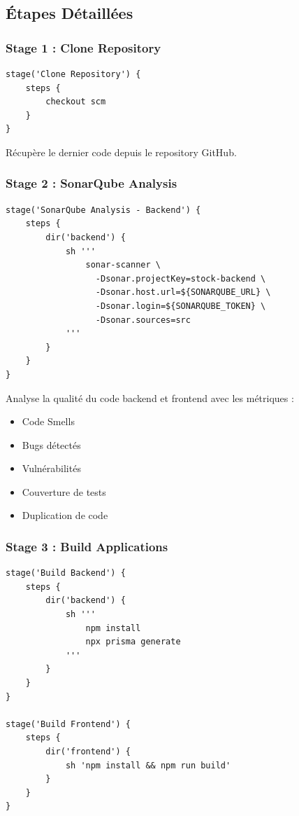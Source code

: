 \documentclass[12pt,a4paper]{report}
\begin{document}
\subsection{Étapes Détaillées}

\subsubsection{Stage 1 : Clone Repository}

\begin{verbatim}
stage('Clone Repository') {
    steps {
        checkout scm
    }
}
\end{verbatim}

Récupère le dernier code depuis le repository GitHub.

\subsubsection{Stage 2 : SonarQube Analysis}

\begin{verbatim}
stage('SonarQube Analysis - Backend') {
    steps {
        dir('backend') {
            sh '''
                sonar-scanner \
                  -Dsonar.projectKey=stock-backend \
                  -Dsonar.host.url=${SONARQUBE_URL} \
                  -Dsonar.login=${SONARQUBE_TOKEN} \
                  -Dsonar.sources=src
            '''
        }
    }
}
\end{verbatim}

Analyse la qualité du code backend et frontend avec les métriques :
\begin{itemize}
    \item Code Smells
    \item Bugs détectés
    \item Vulnérabilités
    \item Couverture de tests
    \item Duplication de code
\end{itemize}

\subsubsection{Stage 3 : Build Applications}

\begin{verbatim}
stage('Build Backend') {
    steps {
        dir('backend') {
            sh '''
                npm install
                npx prisma generate
            '''
        }
    }
}

stage('Build Frontend') {
    steps {
        dir('frontend') {
            sh 'npm install && npm run build'
        }
    }
}
\end{verbatim}
\end{document}
